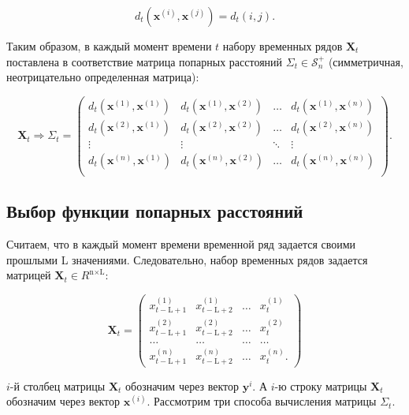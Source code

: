 \documentclass{article}
\begin{document}
\begin{equation}
    d_t(\mathbf{x}^{(i)}, \mathbf{x}^{(j)}) = d_t(i, j).
\end{equation}

Таким образом, в каждый момент времени $t$ набору временных рядов $\mathbf{X}_t$ поставлена в соответствие матрица попарных расстояний $\Sigma_t \in \mathcal{S}_n^+$ (симметричная, неотрицательно определенная матрица):

\begin{equation}
    \mathbf{X}_t \Rightarrow \Sigma_t = \left(
\begin{array}{cccc}
d_t(\mathbf{x}^{(1)}, \mathbf{x}^{(1)}) & d_t(\mathbf{x}^{(1)}, \mathbf{x}^{(2)}) & \ldots & d_t(\mathbf{x}^{(1)}, \mathbf{x}^{(n)})\\
d_t(\mathbf{x}^{(2)}, \mathbf{x}^{(1)}) & d_t(\mathbf{x}^{(2)}, \mathbf{x}^{(2)}) & \ldots & d_t(\mathbf{x}^{(2)}, \mathbf{x}^{(n)})\\
\vdots & \vdots & \ddots & \vdots\\
d_t(\mathbf{x}^{(n)}, \mathbf{x}^{(1)}) & d_t(\mathbf{x}^{(n)}, \mathbf{x}^{(2)}) & \ldots & d_t(\mathbf{x}^{(n)}, \mathbf{x}^{(n)})\\
\end{array}
\right).
\end{equation}

\subsection{Выбор функции попарных расстояний}

Считаем, что в каждый момент времени временной ряд задается своими прошлыми L значениями. Следовательно, набор временных рядов задается матрицей $\mathbf{X}_t \in R^{\text{n} \times \text{L}}$:


\begin{equation}
\mathbf{X}_t = \left( \begin{array}{cccc}
x^{(1)}_{t - \text{L} + 1} & x^{(1)}_{t - \text{L} + 2} & \ldots & x^{(1)}_{t} \\
x^{(2)}_{t - \text{L} + 1} & x^{(2)}_{t - \text{L} + 2} & \ldots & x^{(2)}_{t} \\
\ldots & \ldots & \ldots & \ldots \\
x^{(n)}_{t - \text{L} + 1} & x^{(n)}_{t - \text{L} + 2} & \ldots & x^{(n)}_{t}.
\end{array}\right)
\end{equation}


$i$-й столбец матрицы $\mathbf{X}_t$ обозначим через вектор $\mathbf{y}^{i}$. А $i$-ю строку матрицы $\mathbf{X}_t$ обозначим через вектор $\mathbf{x}^{(i)}$. Рассмотрим три способа вычисления матрицы $\Sigma_t$.
\end{document}
